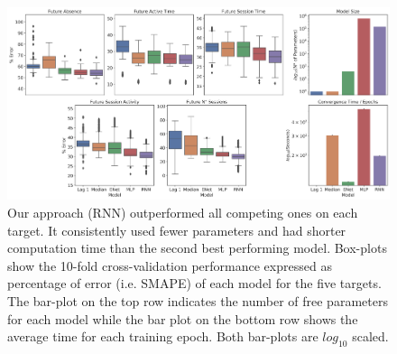 

\begin{figure}[h]
\centering
\includegraphics[width=.8\textwidth]{images/chapter_3/performance_exploded_32.png}
\caption[\textbf{Dis-aggregated comparison of models' performance}]{Our approach (RNN) outperformed all competing ones on each target. It consistently used fewer parameters and had shorter computation time than the second best performing model. Box-plots show the 10-fold cross-validation performance expressed as percentage of error (i.e. SMAPE) of each model for the five targets. The bar-plot on the top row indicates the number of free parameters for each model while the bar plot on the bottom row shows the average time for each training epoch. Both bar-plots are $log_{10}$ scaled.}
\label{model_comp_exp_32} 
\end{figure}

